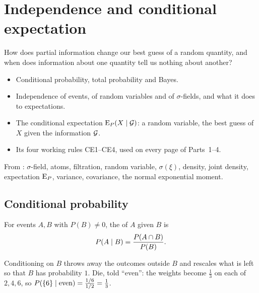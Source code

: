 \chapter{Independence and conditional expectation}
\label{ch:cond}

\begin{question}
How does partial information change our best guess of a random quantity, and when does information about one quantity tell us nothing about another?
\end{question}

\begin{whatfor}
\begin{itemize}
  \item Conditional probability, total probability and Bayes.
  \item Independence of events, of random variables and of $\sigma$-fields, and what it does to expectations.
  \item The conditional expectation $\operatorname{E}_P(X\mid\mathcal G)$: a random variable, the best guess of $X$ given the information $\mathcal G$.
  \item Its four working rules CE1--CE4, used on every page of Parts~1--4.
\end{itemize}
\end{whatfor}

\begin{prereq}
From : $\sigma$-field, atoms, filtration, random variable, $\sigma(\xi)$, density, joint density, expectation $\operatorname{E}_P$, variance, covariance, the normal exponential moment.
\end{prereq}

\section{Conditional probability}

\begin{definition}
For events $A,B$ with $P(B)\ne0$, the  of $A$ given $B$ is
\[
  P(A\mid B)=\frac{P(A\cap B)}{P(B)} .
\]
\end{definition}

Conditioning on $B$ throws away the outcomes outside $B$ and rescales what is left so that $B$ has probability $1$. Die, told ``even'': the weights become $\frac13$ on each of $2,4,6$, so $P(\{6\}\mid\text{even})=\frac{1/6}{1/2}=\frac13$.

